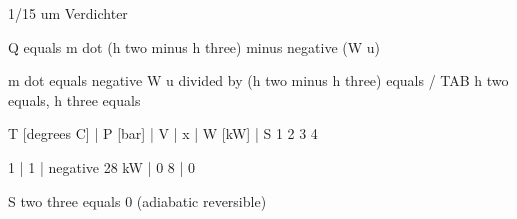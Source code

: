 1/15 um Verdichter

Q equals m dot (h two minus h three) minus negative (W u)

m dot equals negative W u divided by (h two minus h three) equals / TAB h two equals, h three equals

T [degrees C] | P [bar] | V | x | W [kW] | S
1
2
3
4

1 | 1 | negative 28 kW | 0
8 | 0

S two three equals 0 (adiabatic reversible)